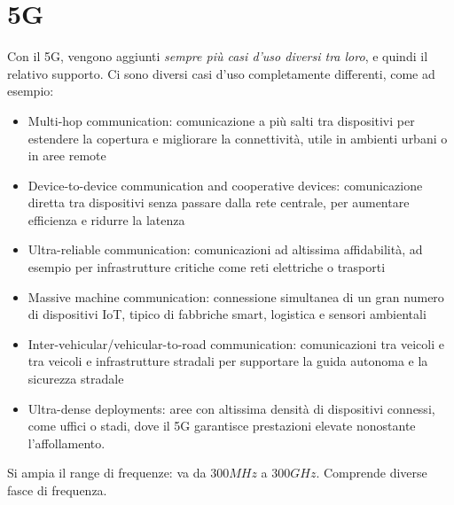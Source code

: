 \section{5G}

Con il 5G, vengono aggiunti \textit{sempre più casi d'uso diversi tra loro}, e quindi il relativo supporto. Ci sono diversi casi d'uso completamente differenti, come ad esempio:
\begin{itemize}
	\item Multi-hop communication: comunicazione a più salti tra dispositivi per estendere la copertura e migliorare la connettività, utile in ambienti urbani o in aree remote

	\item Device-to-device communication and cooperative devices: comunicazione diretta tra dispositivi senza passare dalla rete centrale, per aumentare efficienza e ridurre la latenza	

	\item Ultra-reliable communication: comunicazioni ad altissima affidabilità, ad esempio per infrastrutture critiche come reti elettriche o trasporti

	\item Massive machine communication: connessione simultanea di un gran numero di dispositivi IoT, tipico di fabbriche smart, logistica e sensori ambientali	

	\item Inter-vehicular/vehicular-to-road communication: comunicazioni tra veicoli e tra veicoli e infrastrutture stradali per supportare la guida autonoma e la sicurezza stradale

	\item Ultra-dense deployments: aree con altissima densità di dispositivi connessi, come uffici o stadi, dove il 5G garantisce prestazioni elevate nonostante l'affollamento.
\end{itemize}

Si ampia il range di frequenze: va da $300MHz$ a $300GHz$. Comprende diverse fasce di frequenza.

